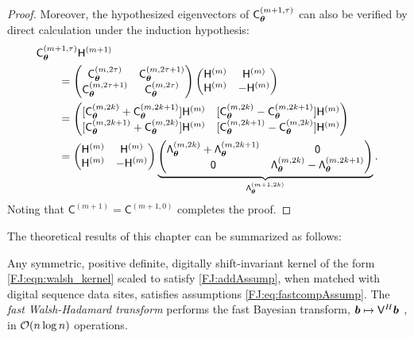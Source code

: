 \documentclass[graybox,footinfo]{svmult}
\begin{document}
\begin{proof}
    Moreover, the hypothesized eigenvectors of $\mathsf{C}_{{\boldsymbol{\theta}}}^{(m+1,\tau)}$ can also be verified by direct calculation under the induction hypothesis:
     \begin{align*}
        \MoveEqLeft{\mathsf{C}_{\bstheta}^{(m+1,\tau)} \mathsf{H}^{(m+1)}} \\
        & =  
        \begin{pmatrix} \mathsf{C}_{\bstheta}^{(m,2 \tau)} & \mathsf{C}_{\bstheta}^{(m,2 \tau+1)} \\
        \mathsf{C}_{\bstheta}^{(m,2 \tau+1)} & \mathsf{C}_{\bstheta}^{(m,2 \tau)}
        \end{pmatrix} 
        \begin{pmatrix}
        \mathsf{H}^{(m)} &   \mathsf{H}^{(m)} \\
         \mathsf{H}^{(m)} & - \mathsf{H}^{(m)}
        \end{pmatrix}\\
        & = 
    \begin{pmatrix}
        [\mathsf{C}_{\bstheta}^{(m,2k)} + \mathsf{C}_{\bstheta}^{(m,2k+1)}] \mathsf{H}^{(m)} & [\mathsf{C}_{\bstheta}^{(m,2k)} - \mathsf{C}_{\bstheta}^{(m,2k+1)}] \mathsf{H}^{(m)}\\
        [\mathsf{C}_{\bstheta}^{(m,2k+1)} + \mathsf{C}_{\bstheta}^{(m,2k)}] \mathsf{H}^{(m)} &   [\mathsf{C}_{\bstheta}^{(m,2k+1)} - \mathsf{C}_{\bstheta}^{(m,2k)}] \mathsf{H}^{(m)}
        \end{pmatrix} \\
        & = \begin{pmatrix}
        \mathsf{H}^{(m)} & \mathsf{H}^{(m)} \\ \mathsf{H}^{(m)} & -\mathsf{H}^{(m)}
        \end{pmatrix} 
        \underbrace{\begin{pmatrix}
        \mathsf{\Lambda}_\bstheta^{(m,2k)} + \mathsf{\Lambda}_\bstheta^{(m,2k+1)}  & \mathsf{0}\\
        \mathsf{0} &   \mathsf{\Lambda}_\bstheta^{(m,2k)} - \mathsf{\Lambda}_\bstheta^{(m,2k+1)}
        \end{pmatrix}}_{\mathsf{\Lambda}_\bstheta^{(m+1,2k)}} 
        .
    \end{align*}
Noting that $\mathsf{C}^{(m+1)} = \mathsf{C}^{(m+1,0)} $ completes the proof.
\end{proof}


The theoretical results of this chapter can be summarized as follows:

\begin{theorem} \label{FJ:thm:main}
	Any symmetric, positive definite, digitally shift-invariant kernel of the form \eqref{FJ:eqn:walsh_kernel} scaled to satisfy \eqref{FJ:addAssump}, when matched with digital sequence data sites, satisfies assumptions \eqref{FJ:eq:fastcompAssump}.  The \emph{fast Walsh-Hadamard transform} performs the fast Bayesian transform,  ${\boldsymbol{b}} \mapsto \mathsf{V}^H {\boldsymbol{b}}$ , in ${\mathcal{O}}(n \log n)$ operations.
\end{theorem}
\end{document}
